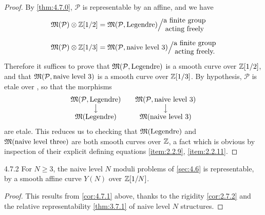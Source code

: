 \begin{proof}
By \ref{thm:4.7.0}, $\mathcal{P}$ is representable by an affine, and we have
\[
\begin{aligned}
\Mfrak(\mathcal{P}) \otimes \Z[1/2] & = \Mfrak(\mathcal{P}, \text{Legendre})\Big/
\begin{array}{@{}c@{}}
\text{a finite group} \\
\text{acting freely}
\end{array} \\[4pt]
\Mfrak(\mathcal{P}) \otimes \Z[1/3] & = \Mfrak(\mathcal{P}, \text{naive level } 3)\Big/
\begin{array}{@{}c@{}}
\text{a finite group} \\
\text{acting freely.}
\end{array}
\end{aligned}
\]
Therefore it suffices to prove that $\mathfrak{M}(\mathcal{P}, \text{Legendre})$ is a smooth curve over $\mathbb{Z}[1/2]$, and that $\mathfrak{M}(\mathcal{P}, \text{naive level } 3)$ is a smooth curve over $\mathbb{Z}[1/3]$. By hypothesis, $\mathcal{P}$ is etale over \Ell, so that the morphisms
\[
\begin{array}{@{}c@{}}
\Mfrak(\mathcal{P}, \text{Legendre}) \\ \big\downarrow \\ \Mfrak(\text{Legendre})
\end{array}
\qquad
\begin{array}{@{}c@{}}
\Mfrak(\mathcal{P}, \text{naive level } 3) \\ \big\downarrow \\ \Mfrak(\text{naive level } 3)
\end{array}
\]
are etale. This reduces us to checking that $\mathfrak{M}(\text{Legendre})$ and $\mathfrak{M}(\text{naive level three})$ are both smooth curves over $\mathbb{Z}$, a fact which is obvious by inspection of their explicit defining equations \ref{item:2.2.9}, \ref{item:2.2.11}.
\end{proof}

\begin{customcor}{4.7.2}\label{cor:4.7.2}
For $N \ge 3$, the naive level $N$ moduli problems of \ref{sec:4.6} is representable, by a smooth affine curve $Y(N)$ over $\mathbb{Z}[1/N]$.
\end{customcor}

\begin{proof}
This results from \ref{cor:4.7.1} above, thanks to the rigidity \ref{cor:2.7.2} and the relative representability \ref{thm:3.7.1} of naive level $N$ structures.
\end{proof}

